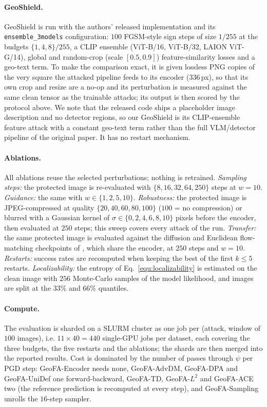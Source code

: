 \paragraph{GeoShield.}
GeoShield \citep{liu2025geoshield} is run with the authors' released implementation and its
\texttt{ensemble\_3models} configuration: $100$ FGSM-style sign steps of size $1/255$ at the
budgets $\{1, 4, 8\}/255$, a CLIP ensemble (ViT-B/16, ViT-B/32, LAION ViT-G/14), global and
random-crop (scale $[0.5, 0.9]$) feature-similarity losses and a geo-text term. To make the
comparison exact, it is given lossless PNG copies of the very square the attacked pipeline
feeds to its encoder ($336$\,px), so that its own crop and resize are a no-op and its
perturbation is measured against the same clean tensor as the trainable attacks; its output is
then scored by the protocol above. We note that the released code ships a placeholder image
description and no detector regions, so our GeoShield is its CLIP-ensemble feature attack with
a constant geo-text term rather than the full VLM/detector pipeline of the original paper. It
has no restart mechanism.

\paragraph{Ablations.}
All ablations reuse the selected perturbations; nothing is retrained. \emph{Sampling steps:}
the protected image is re-evaluated with $\{8, 16, 32, 64, 250\}$ steps at $w=10$.
\emph{Guidance:} the same with $w \in \{1, 2, 5, 10\}$. \emph{Robustness:} the protected image
is JPEG-compressed at quality $\{20, 40, 60, 80, 100\}$ ($100$ = no compression) or blurred
with a Gaussian kernel of $\sigma \in \{0, 2, 4, 6, 8, 10\}$ pixels before the encoder, then
evaluated at $250$ steps; this sweep covers every attack of the run. \emph{Transfer:} the same
protected image is evaluated against the diffusion and Euclidean flow-matching checkpoints of
\citet{dufour2024around}, which share the encoder, at $250$ steps and $w=10$.
\emph{Restarts:} success rates are recomputed when keeping the best of the first $k \le 5$
restarts. \emph{Localizability:} the entropy of Eq.~\ref{equ:localizability} is estimated on
the clean image with $256$ Monte-Carlo samples of the model likelihood, and images are split
at the $33\%$ and $66\%$ quantiles.

\paragraph{Compute.}
The evaluation is sharded on a SLURM cluster as one job per (attack, window of $100$ images),
i.e. $11 \times 40 = 440$ single-GPU jobs per dataset, each covering the three budgets, the
five restarts and the ablations; the shards are then merged into the reported results. Cost is
dominated by the number of passes through $\psi$ per PGD step: GeoFA-Encoder needs none,
GeoFA-AdvDM, GeoFA-DPA and GeoFA-UniDef one forward-backward, GeoFA-TD, GeoFA-$L^2$ and
GeoFA-ACE two (the reference prediction is recomputed at every step), and GeoFA-Sampling
unrolls the $16$-step sampler.
